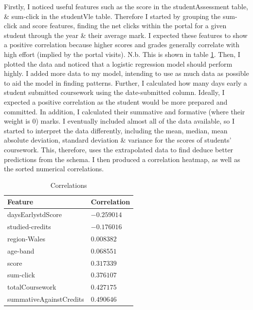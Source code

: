 \documentclass[11pt, a4paper]{article}
\begin{document}
\begin{multicols}{2}
Firstly, I noticed useful features such as the score in the studentAssessment table, \& sum-click in the studentVle table.
Therefore I started by grouping the sum-click and score features, finding the net clicks within the portal for a given student through the year \& their average mark. 
I expected these features to show a positive correlation because higher scores and grades generally correlate with high effort (implied by the portal visits). N.b. This is shown in table \ref{table:Correlations}.
Then, I plotted the data and noticed that a logistic regression model should perform highly. 
I added more data to my model, intending to use as much data as possible to aid the model in finding patterns.
Further, I calculated how many days early a student submitted coursework using the date-submitted column.
Ideally, I expected a positive correlation as the student would be more prepared and committed.
In addition, I calculated their summative and formative (where their weight is 0) marks. 
I eventually included almost all of the data available, so I started to interpret the data differently, including the mean, median, mean absolute deviation, standard deviation \& variance for the scores of students' coursework.
This, therefore, uses the extrapolated data to find deduce better predictions from the schema. 
I then produced a correlation heatmap, as well as the sorted numerical correlations.


\begin{table}[H]
	\centering
	\begin{tabular}{|l|l|}
		\hline
		\textbf{Feature}                    & \textbf{Correlation} \\ \hline
		daysEarlystdScore            & $-0.259014$ \\ \hline
		studied-credits             & $-0.176016$ \\ \hline
		region-Wales                & $0.008382$  \\ \hline
		age-band                    & $0.068551$  \\ \hline
		score                        & $0.317339$  \\ \hline
		sum-click                   & $0.376107$  \\ \hline
		totalCoursework              & $0.427175$  \\ \hline
		summativeAgainstCredits      & $0.490646$  \\ \hline
		\end{tabular}
		\caption{Correlations}
		\label{table:Correlations}
\end{table}


\end{multicols}
\end{document}
